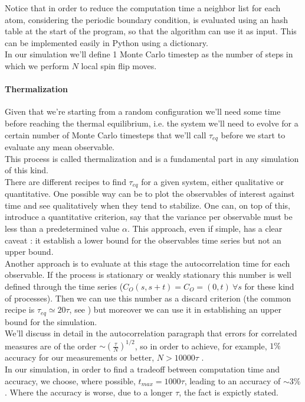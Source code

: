 Notice that in order to reduce the computation time a neighbor list for each atom, considering the periodic boundary condition, 
is evaluated using an hash table at the start of the program, so that the algorithm can use it as input. This can be implemented
 easily in Python using a dictionary. \\
In our simulation we'll define 1 Monte Carlo timestep as the number of steps in which we perform $N$ local spin flip moves. \\

\paragraph{Thermalization} Given that we're starting from a random configuration we'll need some time before reaching the thermal equilibrium, 
i.e. the system we'll need to evolve for a certain number of Monte Carlo timesteps that we'll call $\tau_{eq}$ before we start to evaluate any mean observable. \\
This process is called thermalization and is a fundamental part in any simulation of this kind. \\
There are different recipes to find $\tau_{eq}$ for a given system, either qualitative or quantitative. One possible way can be to plot the
observables of interest against time and see qualitatively when they tend to stabilize. One can, on top of this, introduce a quantitative criterion,
say that the variance per observable must be less than a predetermined value $\alpha$. This approach, even if simple, has a clear caveat : it establish a lower
bound for the observables time series but not an upper bound. \\
Another approach is to evaluate at this stage the autocorrelation time for each observable. If the process is stationary or weakly stationary this number is 
well defined through the time series ($C_O(s, s+t) = C_O=(0, t)\ \forall s$ for these kind of processes). Then we can use this number as a discard criterion 
(the common recipe is $\tau_{eq} \simeq 20 \tau$, see \cite{Sokal1997}) but moreover we can use it in establishing an upper bound for the simulation. \\
We'll discuss in detail in the autocorrelation paragraph that errors for correlated measures are of the order $\sim (\frac{\tau}{N})^{1/2}$, so in order to 
achieve, for example, $1 \%$ accuracy for our measurements or better, $N > 10000\tau$ . \\
In our simulation, in order to find a tradeoff between computation time and accuracy, we choose, where possible, $t_{max} = 1000\tau$, leading
to an accuracy of $\sim 3 \%$. Where the accuracy is worse, due to a longer $\tau$, the fact is expictly stated. \\

